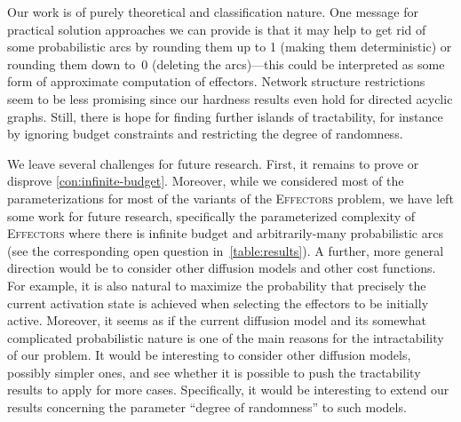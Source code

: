 \documentclass{article}
\newcommand{\probEffectors}{\textsc{Effectors}\xspace}
\begin{document}
Our work is of purely theoretical and classification nature. One message for practical solution approaches we can provide is that it may help to get rid of some probabilistic arcs by rounding them up to 1 (making them deterministic) or rounding them down to~0 (deleting the arcs)---this could be interpreted as some form of approximate computation of effectors. Network structure restrictions seem to be less promising since our hardness results even hold for directed acyclic graphs. Still, there is hope for finding further islands of tractability, for instance by ignoring budget constraints and restricting the degree of randomness.

We leave several challenges for future research.
First, it remains to prove or disprove \autoref{con:infinite-budget}.
Moreover,
while we considered most of the parameterizations for most of the variants of the \probEffectors problem,
we have left some work for future research,
specifically the parameterized complexity of \probEffectors where there is infinite budget and arbitrarily-many probabilistic arcs
(see the corresponding open question in~\autoref{table:results}).
A further,
more general direction would be to consider other diffusion models and other cost functions.
For example,
it is also natural to maximize the probability that precisely the current activation state is achieved
when selecting the effectors to be initially active.
Moreover,
it seems as if the current diffusion model and its somewhat complicated probabilistic nature
is one of the main reasons for the intractability of our problem.
It would be interesting to consider other diffusion models,
possibly simpler ones,
and see whether it is possible to push the tractability results to apply for more cases.
Specifically,
it would be interesting to extend our results concerning the parameter ``degree of randomness'' to such models.






\end{document}
